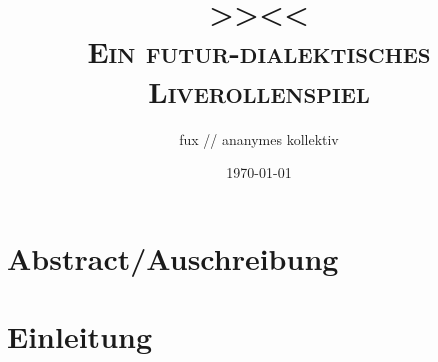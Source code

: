 \documentclass[12pt, a4paper, openany]{book}
\title{
  { \Large 
    \textbf{\textsc{>>\game<<}}\\
  }
  \vspace{0.4cm}
  { \large \color{gray}
    \textsc{Ein futur-dialektisches Liverollenspiel}
  }
}
\author{fux // ananymes kollektiv}
\date{{\small \today}}
\begin{document}
\frontmatter
\maketitle

\chapter*{Abstract/Auschreibung}


\tableofcontents



\mainmatter
\chapter*{Einleitung}

\end{document}
